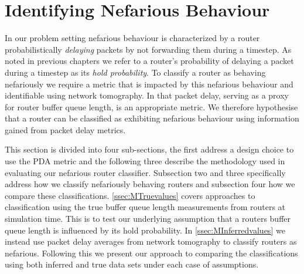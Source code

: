 \section{Identifying Nefarious Behaviour}
\label{sec:MNefidentification}
  In our problem setting nefarious behaviour is characterized by a router probabilistically \textit{delaying} packets by not forwarding them during a timestep. As noted in previous chapters we refer to a router's probability of delaying a packet during a timestep as its \textit{hold probability}. To classify a router as behaving nefariously we require a metric that is impacted by this nefarious behaviour and identifiable using network tomography. In that packet delay, serving as a proxy for router buffer queue length, is an appropriate metric. We therefore hypothesise that a router can be classified as exhibiting nefarious behaviour using information gained from packet delay metrics.\par
  This section is divided into four sub-sections, the first address a design choice to use the PDA metric and the following three describe the methodology used in evaluating our nefarious router classifier. Subsection two and three specifically address how we classify nefariously behaving routers and subsection four how we compare these classifications. \cref{ssec:MTruevalues} covers approaches to classification using the true buffer queue length measurements from routers at simulation time. This is to test our underlying assumption that a routers buffer queue length is influenced by its hold probability. In \cref{ssec:MInferredvalues} we instead use packet delay averages from network tomography to classify routers as nefarious. Following this we present our approach to comparing the classifications using both inferred and true data sets under each case of assumptions.
  
